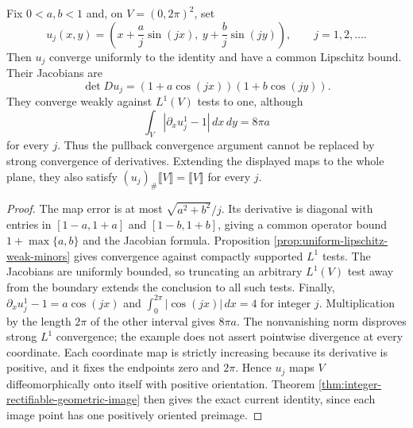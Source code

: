 \begin{example}\label{ex:weak-minors-oscillating-maps}
Fix $0<a,b<1$ and, on $V=(0,2\pi)^2$, set
\[
 u_j(x,y)=\left(x+\frac aj\sin(jx),\ y+\frac bj\sin(jy)\right),
 \qquad j=1,2,\ldots.
\]
Then $u_j$ converge uniformly to the identity and have a common Lipschitz bound. Their Jacobians are
\[
 \det Du_j=(1+a\cos(jx))(1+b\cos(jy)).
\]
They converge weakly against $L^1(V)$ tests to one, although
\[
 \int_V|\partial_xu_j^1-1|\,dx\,dy=8\pi a
\]
for every $j$. Thus the pullback convergence argument cannot be replaced by strong convergence of derivatives. Extending the displayed maps to the whole plane, they also satisfy $(u_j)_\#\llbracket V\rrbracket=\llbracket V\rrbracket$ for every $j$.
\end{example}
\begin{proof}
The map error is at most $\sqrt{a^2+b^2}/j$. Its derivative is diagonal with entries in $[1-a,1+a]$ and $[1-b,1+b]$, giving a common operator bound $1+\max\{a,b\}$ and the Jacobian formula. Proposition \ref{prop:uniform-lipschitz-weak-minors} gives convergence against compactly supported $L^1$ tests. The Jacobians are uniformly bounded, so truncating an arbitrary $L^1(V)$ test away from the boundary extends the conclusion to all such tests. Finally, $\partial_xu_j^1-1=a\cos(jx)$ and $\int_0^{2\pi}|\cos(jx)|\,dx=4$ for integer $j$. Multiplication by the length $2\pi$ of the other interval gives $8\pi a$. The nonvanishing norm disproves strong $L^1$ convergence; the example does not assert pointwise divergence at every coordinate. Each coordinate map is strictly increasing because its derivative is positive, and it fixes the endpoints zero and $2\pi$. Hence $u_j$ maps $V$ diffeomorphically onto itself with positive orientation. Theorem \ref{thm:integer-rectifiable-geometric-image} then gives the exact current identity, since each image point has one positively oriented preimage.
\end{proof}

